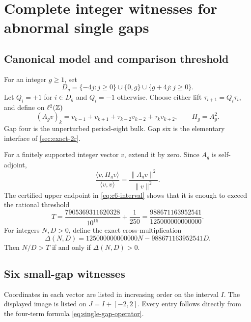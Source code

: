 \section{Complete integer witnesses for abnormal single gaps}
\label{sec:single-gap}

\subsection{Canonical model and comparison threshold}

For an integer \(g\geq1\), set
\[
 D_g=\{-4j:j\geq0\}\cup\{0,g\}\cup\{g+4j:j\geq0\}.
\]
Let \(Q_i=+1\) for \(i\in D_g\) and \(Q_i=-1\) otherwise.  Choose either
lift \(\tau_{i+1}=Q_i\tau_i\), and define on \(\ell^2(\mathbb Z)\)
\begin{equation}
 (A_gv)_k=v_{k-1}+v_{k+1}+\tau_{k-2}v_{k-2}+\tau_kv_{k+2},
 \qquad H_g=A_g^2.
 \label{eq:single-gap-operator}
\end{equation}
Gap four is the unperturbed period-eight bulk.  Gap six is the elementary
interface of \cref{sec:exact-2r}.

For a finitely supported integer vector \(v\), extend it by zero.  Since
\(A_g\) is self-adjoint,
\begin{equation}
 \frac{\langle v,H_gv\rangle}{\langle v,v\rangle}
 =\frac{\|A_gv\|^2}{\|v\|^2}.
 \label{eq:rayleigh}
\end{equation}
The certified upper endpoint in \eqref{eq:c6-interval} shows that it is
enough to exceed the rational threshold
\begin{equation}
 T=\frac{7905369311620328}{10^{15}}+\frac1{250}
 =\frac{988671163952541}{125000000000000}.
 \label{eq:T}
\end{equation}
For integers \(N,D>0\), define the exact cross-multiplication
\begin{equation}
 \Delta(N,D)=125000000000000N-988671163952541D.
 \label{eq:Delta}
\end{equation}
Then \(N/D>T\) if and only if \(\Delta(N,D)>0\).

\subsection{Six small-gap witnesses}

Coordinates in each vector are listed in increasing order on the interval
\(I\).  The displayed image is listed on \(J=I+[-2,2]\).  Every entry follows
directly from the four-term formula \eqref{eq:single-gap-operator}.

